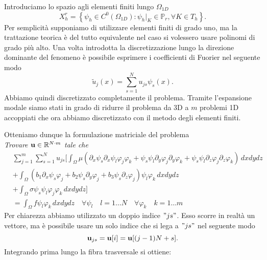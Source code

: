 Introduciamo lo spazio agli elementi finiti lungo $\Omega_{1D}$
\begin{equation*}
\label{eq: spazio polinomiale}
X_h^r= \left\{\psi_h \in C^0(\Omega_{1D}): \psi_h \vert_K  \in \mathbb{P}_r,\forall K\in T_h \right\}.
\end{equation*}
Per semplicit\`a supponiamo di utilizzare elementi finiti di grado uno, ma
la trattazione teorica \`e del tutto equivalente nel caso si volessero usare 
polinomi di grado pi\`u alto.
Una volta introdotta la discretizzazione lungo la direzione dominante 
del fenomeno \`e possibile esprimere i coefficienti di Fuorier 
nel seguente modo
\begin{equation*}
\label{eq: coeff fourier espansi}
\tilde{u}_j(x)=\sum_{s=1}^Nu_{js}\psi_s(x).
\end{equation*}
Abbiamo quindi discretizzato completamente il problema. Tramite l'espansione modale
siamo stati in grado di ridurre il problema da 3D a $m$ problemi 1D accoppiati che ora
abbiamo discretizzato con il metodo degli elementi finiti.

Otteniamo dunque la formulazione matriciale del problema\\
\emph{Trovare $\mathbf{u} \in \mathbb{R}^{N\cdot m}$ tale che}
\begin{equation*}
\begin{split}
&\sum_{j=1}^m \sum_{s=1}^N
u_{js} \Bigg[ \int_\Omega\mu( \partial_x\psi_s \partial_x\psi_l\varphi _j\varphi _k + \psi_s \psi_l \partial_y\varphi _j\partial_y\varphi _k + \psi_s \psi_l \partial_z\varphi _j\partial_z\varphi _k)\,dxdydz \\
&+ \int_\Omega (b_1\partial_x\psi_s\varphi _j+b_2\psi_s\partial_y\varphi _j + b_3\psi_s\partial_z\varphi_j)\psi_l\varphi _k\,dxdydz\\ 
&+\int_\Omega \sigma\psi_s\psi_l\varphi _j\varphi _k\,dxdydz \Bigg]\\
&=\int_\Omega f\psi_l\varphi _k\,dxdydz\quad \forall \psi_l\quad l=1\ldots N\quad\forall \varphi_k\quad k=1\ldots m
\end{split}
\end{equation*}
Per chiarezza abbiamo utilizzato un doppio indice $"js"$. Esso scorre in realt\`a  un vettore,
ma \`e possibile usare un solo indice che si lega a $"js"$ nel seguente modo
$$\mathbf{u}_{js}=\mathbf{u}[i]=\mathbf{u}[(j-1)N+s].$$ 
Integrando prima lungo la fibra trasversale si ottiene:


